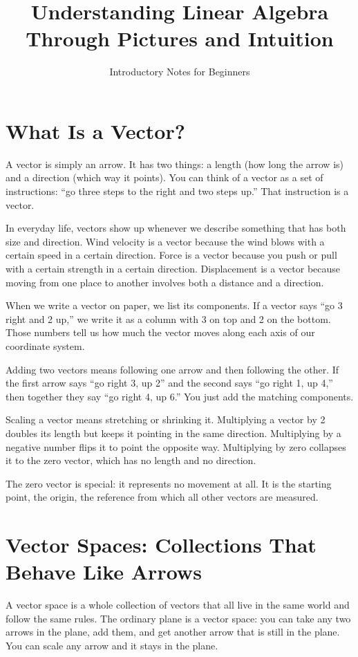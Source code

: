 \documentclass[11pt]{article}
\title{Understanding Linear Algebra Through Pictures and Intuition}
\author{Introductory Notes for Beginners}
\date{}
\begin{document}
\maketitle

\section*{What Is a Vector?}

A vector is simply an arrow. It has two things: a length (how long the arrow is) and a direction (which way it points). You can think of a vector as a set of instructions: ``go three steps to the right and two steps up.'' That instruction is a vector.

In everyday life, vectors show up whenever we describe something that has both size and direction. Wind velocity is a vector because the wind blows with a certain speed in a certain direction. Force is a vector because you push or pull with a certain strength in a certain direction. Displacement is a vector because moving from one place to another involves both a distance and a direction.

When we write a vector on paper, we list its components. If a vector says ``go 3 right and 2 up,'' we write it as a column with 3 on top and 2 on the bottom. Those numbers tell us how much the vector moves along each axis of our coordinate system.

Adding two vectors means following one arrow and then following the other. If the first arrow says ``go right 3, up 2'' and the second says ``go right 1, up 4,'' then together they say ``go right 4, up 6.'' You just add the matching components.

Scaling a vector means stretching or shrinking it. Multiplying a vector by 2 doubles its length but keeps it pointing in the same direction. Multiplying by a negative number flips it to point the opposite way. Multiplying by zero collapses it to the zero vector, which has no length and no direction.

The zero vector is special: it represents no movement at all. It is the starting point, the origin, the reference from which all other vectors are measured.

\section*{Vector Spaces: Collections That Behave Like Arrows}

A vector space is a whole collection of vectors that all live in the same world and follow the same rules. The ordinary plane is a vector space: you can take any two arrows in the plane, add them, and get another arrow that is still in the plane. You can scale any arrow and it stays in the plane.
\end{document}
